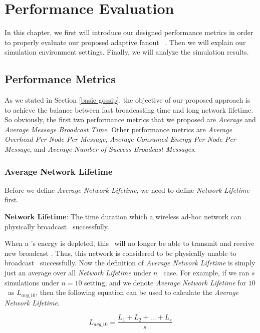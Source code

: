 \chapter{Performance Evaluation}
\label{Chapter5}

In this chapter, we first will introduce our designed performance metrics in order to properly evaluate our proposed adaptive fanout \pp ~\gp. Then we will explain our simulation environment settings. Finally, we will analyze the simulation results.

\section{Performance Metrics} \label{pm}
As we stated in Section \ref{basic gossip}, the objective of our proposed approach is to achieve the balance between fast broadcasting time and long network lifetime. So obviously, the first two performance metrics that we proposed are \emph{Average \nl} and \emph{Average Message Broadcast Time}. Other performance metrics are \emph{Average Overhead Per Node Per Message}, \emph{Average Consumed Energy Per Node Per Message}, and \emph{Average Number of Success Broadcast Messages}.

\subsection{Average Network Lifetime}

Before we define \emph{Average Network Lifetime}, we need to define \emph{Network Lifetime} first. 

\textbf{Network Lifetime}: The time duration which a wireless ad-hoc network can physically broadcast \msgs ~successfully.

When a \gn's energy is depleted, this \gn ~will no longer be able to transmit and receive new broadcast \msgs. Thus, this network is considered to be physically unable to broadcast \msgs ~successfully. Now the definition of \emph{Average Network Lifetime} is simply just an average over all \emph{Network Lifetime} under $n$ \gns ~case. For example, if we ran $s$ simulations under $n=10$ setting, and we denote \emph{Average Network Lifetime} for $10$ \gns ~as $L_{avg\_10}$, then the following equation can be used to calculate the \emph{Average Network Lifetime}.

\[ L_{avg\_10} =\frac{L_1 + L_2 + \ldots + L_{s}}{s} \]

